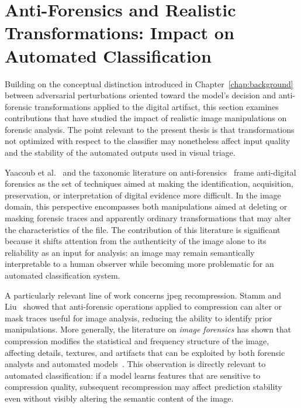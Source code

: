 \section{Anti-Forensics and Realistic Transformations: Impact on Automated Classification}
\label{sec:sota-antiforensics}

Building on the conceptual distinction introduced in
Chapter~\ref{chap:background} between adversarial perturbations oriented toward
the model's decision and anti-forensic transformations applied to the digital
artifact, this section examines contributions that have studied the impact of
realistic image manipulations on forensic analysis. The point relevant to the
present thesis is that transformations not optimized with respect to the
classifier may nonetheless affect input quality and the stability of the
automated outputs used in visual triage.

Yaacoub et al.~\cite{yaacoub2021digital} and the taxonomic literature on
anti-forensics~\cite{hewling2018anti} frame anti-digital forensics as the set
of techniques aimed at making the identification, acquisition, preservation, or
interpretation of digital evidence more difficult. In the image domain, this
perspective encompasses both manipulations aimed at deleting or masking forensic
traces and apparently ordinary transformations that may alter the
characteristics of the file. The contribution of this literature is significant
because it shifts attention from the authenticity of the image alone to its
reliability as an input for analysis: an image may remain semantically
interpretable to a human observer while becoming more problematic for an
automated classification system.

A particularly relevant line of work concerns \gls{jpeg} recompression. Stamm
and Liu~\cite{stamm2010anti} showed that anti-forensic operations applied to
compression can alter or mask traces useful for image analysis, reducing the
ability to identify prior manipulations. More generally, the literature on
\textit{image forensics} has shown that compression modifies the statistical
and frequency structure of the image, affecting details, textures, and
artifacts that can be exploited by both forensic analysts and automated
models~\cite{farid2016photo,stamm2013information}. This observation is directly
relevant to automated classification: if a model learns features that are
sensitive to compression quality, subsequent recompression may affect
prediction stability even without visibly altering the semantic content of the
image.

